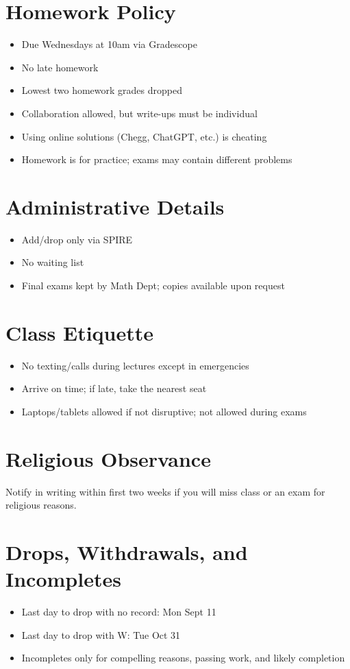 \documentclass[11pt]{article}
\begin{document}
\section{Homework Policy}
\label{sec:org906384d}
\begin{itemize}
\item Due Wednesdays at 10am via Gradescope
\item No late homework
\item Lowest two homework grades dropped
\item Collaboration allowed, but write-ups must be individual
\item Using online solutions (Chegg, ChatGPT, etc.) is cheating
\item Homework is for practice; exams may contain different problems
\end{itemize}

\section{Administrative Details}
\label{sec:org4b5c44e}
\begin{itemize}
\item Add/drop only via SPIRE
\item No waiting list
\item Final exams kept by Math Dept; copies available upon request
\end{itemize}

\section{Class Etiquette}
\label{sec:org353f10d}
\begin{itemize}
\item No texting/calls during lectures except in emergencies
\item Arrive on time; if late, take the nearest seat
\item Laptops/tablets allowed if not disruptive; not allowed during exams
\end{itemize}

\section{Religious Observance}
\label{sec:org5da6afc}
Notify in writing within first two weeks if you will miss class or an exam for religious reasons.

\section{Drops, Withdrawals, and Incompletes}
\label{sec:org9525986}
\begin{itemize}
\item Last day to drop with no record: Mon Sept 11
\item Last day to drop with W: Tue Oct 31
\item Incompletes only for compelling reasons, passing work, and likely completion
\end{itemize}
\end{document}
